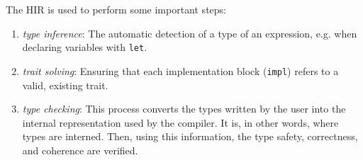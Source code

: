 \documentclass[../Thesis.tex]{subfiles}
\begin{document}
The HIR is used to perform some important steps:

\begin{enumerate}
    \item \emph{type inference}: The automatic detection of a type
          of an expression, e.g. when declaring variables with \texttt{let}.
    \item \emph{trait solving}: Ensuring that each implementation block (\texttt{impl})
          refers to a valid, existing trait.
    \item \emph{type checking}: This process converts the types written by the user
          into the internal representation used by the compiler.
          It is, in other words, where types are interned.
          Then, using this information, the type safety, correctness, and coherence are verified.
\end{enumerate}
\end{document}
